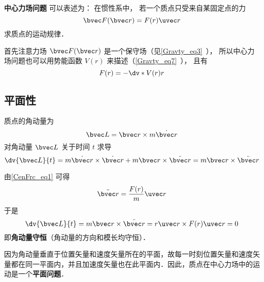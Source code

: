 
\textbf{中心力场问题} 可以表述为： 在惯性系中， 若一个质点只受来自某固定点的力
\begin{equation}\label{CenFrc_eq1}
\bvec F(\bvec r) = F(r) \uvec r
\end{equation}
求质点的运动规律．

首先注意力场 $\bvec F(\bvec r)$ 是一个保守场（见\autoref{Gravty_eq3}~）， 所以中心力场问题也可以用势能函数 $V(r)$ 来描述（\autoref{Gravty_eq7}~）， 且有
\begin{equation}
F(r) = -\dv*{V(r)}{r}
\end{equation}

\subsection{平面性}
质点的角动量为
\begin{equation}
\bvec L =\bvec r \times m \dot{\bvec r}
\end{equation}
对角动量 $\bvec L$ 关于时间 $t$ 求导
\begin{equation}
\dv{\bvec L}{t} =m \dot{\bvec r} \times \dot{\bvec r} +m \bvec r \times \ddot{\bvec r}=m \bvec r \times \ddot{\bvec r}
\end{equation}

由\autoref{CenFrc_eq1} 可得
\begin{equation}
\ddot{\bvec r} = \frac{F(r)}{m}\uvec r
\end{equation}
于是
\begin{equation}
\dv{\bvec L}{t} =m \bvec r \times \ddot{\bvec r}= r \uvec r \times F(r)\uvec r=0
\end{equation}
即\textbf{角动量守恒}（角动量的方向和模长均守恒）．

因为角动量垂直于位置矢量和速度矢量所在的平面，故每一时刻位置矢量和速度矢量都在同一平面内，并且加速度矢量也在此平面内．因此，质点在中心力场中的运动是一个\textbf{平面问题}．

